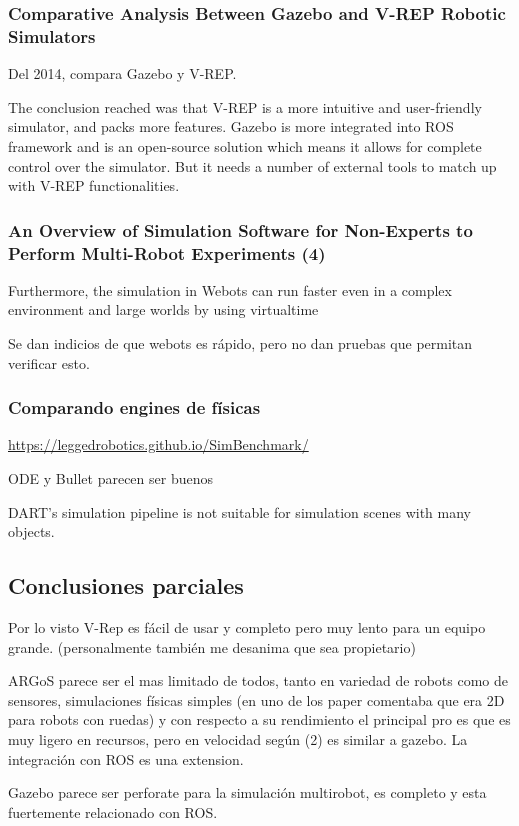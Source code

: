 \subsubsection{Comparative Analysis Between Gazebo and V-REP Robotic Simulators}
Del 2014, compara Gazebo y V-REP.

The conclusion reached was that V-REP is a more intuitive and user-friendly simulator, and packs more features. Gazebo is more integrated into ROS framework and is an open-source solution  which  means  it  allows  for  complete  control over the simulator. But it needs a number of external tools to match  up  with  V-REP  functionalities. 

\subsubsection{An Overview of Simulation Software for Non-Experts to Perform Multi-Robot Experiments (4)}

Furthermore, the simulation in Webots can run faster even in  a  complex environment and large worlds by using virtualtime

Se dan indicios de que webots es rápido, pero no dan pruebas que permitan verificar esto.

\subsubsection{Comparando engines de físicas}
\url{https://leggedrobotics.github.io/SimBenchmark/}

ODE y Bullet parecen ser buenos

DART's simulation pipeline is not suitable for simulation scenes with many objects.

\subsection{Conclusiones parciales}
Por lo visto V-Rep es fácil de usar y completo pero muy lento para un equipo grande. (personalmente también me desanima que sea propietario)

ARGoS parece ser el mas limitado de todos, tanto en variedad de robots como de sensores, simulaciones físicas simples (en uno de los paper comentaba que era 2D para robots con ruedas) y con respecto a su rendimiento el principal pro es que es muy ligero en recursos, pero en velocidad según (2) es similar a gazebo. La integración con ROS es una extension.

Gazebo parece ser perforate para la simulación multirobot, es completo y esta fuertemente relacionado con ROS.

